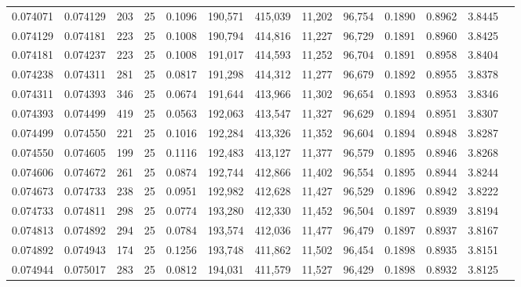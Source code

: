 \begin{tabular}{rrrrrrrrrrrrr}
0.074071 & 0.074129 &   203 &  25 &                                     0.1096 & 190,571 & 415,039 &  11,202 &  96,754 & 0.1890 & 0.8962 & 3.8445 \\
0.074129 & 0.074181 &   223 &  25 &                                     0.1008 & 190,794 & 414,816 &  11,227 &  96,729 & 0.1891 & 0.8960 & 3.8425 \\
0.074181 & 0.074237 &   223 &  25 &                                     0.1008 & 191,017 & 414,593 &  11,252 &  96,704 & 0.1891 & 0.8958 & 3.8404 \\
0.074238 & 0.074311 &   281 &  25 &                                     0.0817 & 191,298 & 414,312 &  11,277 &  96,679 & 0.1892 & 0.8955 & 3.8378 \\
0.074311 & 0.074393 &   346 &  25 &                                     0.0674 & 191,644 & 413,966 &  11,302 &  96,654 & 0.1893 & 0.8953 & 3.8346 \\
0.074393 & 0.074499 &   419 &  25 &                                     0.0563 & 192,063 & 413,547 &  11,327 &  96,629 & 0.1894 & 0.8951 & 3.8307 \\
0.074499 & 0.074550 &   221 &  25 &                                     0.1016 & 192,284 & 413,326 &  11,352 &  96,604 & 0.1894 & 0.8948 & 3.8287 \\
0.074550 & 0.074605 &   199 &  25 &                                     0.1116 & 192,483 & 413,127 &  11,377 &  96,579 & 0.1895 & 0.8946 & 3.8268 \\
0.074606 & 0.074672 &   261 &  25 &                                     0.0874 & 192,744 & 412,866 &  11,402 &  96,554 & 0.1895 & 0.8944 & 3.8244 \\
0.074673 & 0.074733 &   238 &  25 &                                     0.0951 & 192,982 & 412,628 &  11,427 &  96,529 & 0.1896 & 0.8942 & 3.8222 \\
0.074733 & 0.074811 &   298 &  25 &                                     0.0774 & 193,280 & 412,330 &  11,452 &  96,504 & 0.1897 & 0.8939 & 3.8194 \\
0.074813 & 0.074892 &   294 &  25 &                                     0.0784 & 193,574 & 412,036 &  11,477 &  96,479 & 0.1897 & 0.8937 & 3.8167 \\
0.074892 & 0.074943 &   174 &  25 &                                     0.1256 & 193,748 & 411,862 &  11,502 &  96,454 & 0.1898 & 0.8935 & 3.8151 \\
0.074944 & 0.075017 &   283 &  25 &                                     0.0812 & 194,031 & 411,579 &  11,527 &  96,429 & 0.1898 & 0.8932 & 3.8125 \\

\end{tabular}
